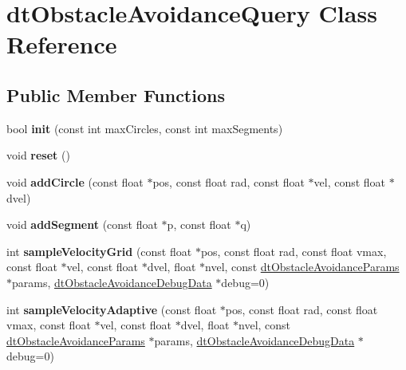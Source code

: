 \hypertarget{classdtObstacleAvoidanceQuery}{}\section{dt\+Obstacle\+Avoidance\+Query Class Reference}
\label{classdtObstacleAvoidanceQuery}
\subsection*{Public Member Functions}
\begin{DoxyCompactItemize}
\item 
\mbox{\label{classdtObstacleAvoidanceQuery_a9f927e4f09b35473853be3bf7f28129a}} 
bool {\bfseries init} (const int max\+Circles, const int max\+Segments)
\item 
\mbox{\label{classdtObstacleAvoidanceQuery_a993c62548ead013ac1cb622c43c175ad}} 
void {\bfseries reset} ()
\item 
\mbox{\label{classdtObstacleAvoidanceQuery_aca861fb3e13b8785124b655b8313de45}} 
void {\bfseries add\+Circle} (const float $\ast$pos, const float rad, const float $\ast$vel, const float $\ast$dvel)
\item 
\mbox{\label{classdtObstacleAvoidanceQuery_ab0abab88b2cba7747e6ed38470ca6eff}} 
void {\bfseries add\+Segment} (const float $\ast$p, const float $\ast$q)
\item 
\mbox{\label{classdtObstacleAvoidanceQuery_a5209e8625a0618fd9c96ba2d0374d90f}} 
int {\bfseries sample\+Velocity\+Grid} (const float $\ast$pos, const float rad, const float vmax, const float $\ast$vel, const float $\ast$dvel, float $\ast$nvel, const \hyperlink{structdtObstacleAvoidanceParams}{dt\+Obstacle\+Avoidance\+Params} $\ast$params, \hyperlink{classdtObstacleAvoidanceDebugData}{dt\+Obstacle\+Avoidance\+Debug\+Data} $\ast$debug=0)
\item 
\mbox{\label{classdtObstacleAvoidanceQuery_aecf2d1d53bc0c74997ff3aac1587c242}} 
int {\bfseries sample\+Velocity\+Adaptive} (const float $\ast$pos, const float rad, const float vmax, const float $\ast$vel, const float $\ast$dvel, float $\ast$nvel, const \hyperlink{structdtObstacleAvoidanceParams}{dt\+Obstacle\+Avoidance\+Params} $\ast$params, \hyperlink{classdtObstacleAvoidanceDebugData}{dt\+Obstacle\+Avoidance\+Debug\+Data} $\ast$debug=0)

\end{DoxyCompactItemize}
